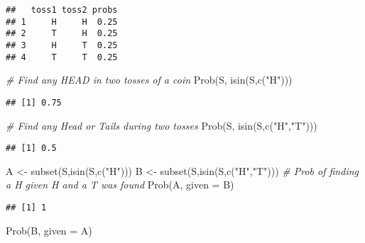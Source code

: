 \documentclass[
]{article}
\newenvironment{Shaded}{\begin{snugshade}}{\end{snugshade}}
\newcommand{\AttributeTok}[1]{\textcolor[rgb]{0.77,0.63,0.00}{#1}}
\newcommand{\CommentTok}[1]{\textcolor[rgb]{0.56,0.35,0.01}{\textit{#1}}}
\newcommand{\FunctionTok}[1]{\textcolor[rgb]{0.00,0.00,0.00}{#1}}
\newcommand{\NormalTok}[1]{#1}
\newcommand{\OtherTok}[1]{\textcolor[rgb]{0.56,0.35,0.01}{#1}}
\newcommand{\StringTok}[1]{\textcolor[rgb]{0.31,0.60,0.02}{#1}}
\begin{document}
\begin{verbatim}
##   toss1 toss2 probs
## 1     H     H  0.25
## 2     T     H  0.25
## 3     H     T  0.25
## 4     T     T  0.25
\end{verbatim}

\begin{Shaded}
\begin{Highlighting}[]
\CommentTok{\# Find any HEAD in two tosses of a coin}
\FunctionTok{Prob}\NormalTok{(S, }\FunctionTok{isin}\NormalTok{(S,}\FunctionTok{c}\NormalTok{(}\StringTok{"H"}\NormalTok{)))}
\end{Highlighting}
\end{Shaded}

\begin{verbatim}
## [1] 0.75
\end{verbatim}

\begin{Shaded}
\begin{Highlighting}[]
\CommentTok{\# Find any Head or Tails during two tosses}
\FunctionTok{Prob}\NormalTok{(S, }\FunctionTok{isin}\NormalTok{(S,}\FunctionTok{c}\NormalTok{(}\StringTok{"H"}\NormalTok{,}\StringTok{"T"}\NormalTok{)))}
\end{Highlighting}
\end{Shaded}

\begin{verbatim}
## [1] 0.5
\end{verbatim}

\begin{Shaded}
\begin{Highlighting}[]
\NormalTok{A }\OtherTok{\textless{}{-}} \FunctionTok{subset}\NormalTok{(S,}\FunctionTok{isin}\NormalTok{(S,}\FunctionTok{c}\NormalTok{(}\StringTok{"H"}\NormalTok{)))}
\NormalTok{B }\OtherTok{\textless{}{-}} \FunctionTok{subset}\NormalTok{(S,}\FunctionTok{isin}\NormalTok{(S,}\FunctionTok{c}\NormalTok{(}\StringTok{"H"}\NormalTok{,}\StringTok{"T"}\NormalTok{)))}
\CommentTok{\# Prob of finding a H given H and a T was found}
\FunctionTok{Prob}\NormalTok{(A, }\AttributeTok{given =}\NormalTok{ B)}
\end{Highlighting}
\end{Shaded}

\begin{verbatim}
## [1] 1
\end{verbatim}

\begin{Shaded}
\begin{Highlighting}[]
\FunctionTok{Prob}\NormalTok{(B, }\AttributeTok{given =}\NormalTok{ A)}
\end{Highlighting}
\end{Shaded}
\end{document}
